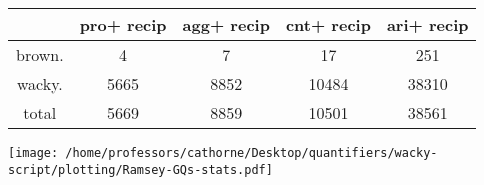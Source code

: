 \documentclass[a4,10pt]{article}
\begin{document}
\begin{sidewaystable}[p]
\tiny{\begin{tabular}{|c|c|c|c|c|}
 & pro+
recip & agg+
recip & cnt+
recip & ari+
recip\\
\hline
brown. & 4 & 7 & 17 & 251\\
wacky. & 5665 & 8852 & 10484 & 38310\\
\hline
total & 5669 & 8859 & 10501 & 38561
\end{tabular}}
\end{sidewaystable}



\vspace{0.2cm}

\begin{center}
\texttt{[image: /home/professors/cathorne/Desktop/quantifiers/wacky-script/plotting/Ramsey-GQs-stats.pdf]}
\end{center}
\end{document}
